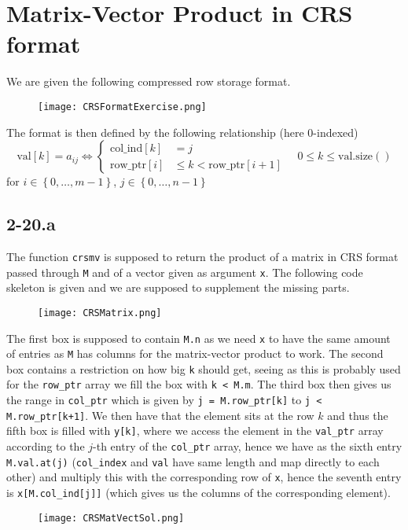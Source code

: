 \documentclass{article}
\begin{document}
\section*{Matrix-Vector Product in CRS format}
We are given the following compressed row storage format.
\begin{figure}[!hbt]
    \centering
\texttt{[image: CRSFormatExercise.png]}
\end{figure}
The format is then defined by the following relationship (here $0$-indexed)
\begin{equation*}
    \text{val}\left[k\right] = a_{ij} \Longleftrightarrow 
    \begin{cases}
        \text{col\_ind}\left[k\right]& = j \\
        \text{row\_ptr}\left[i\right] &\leq k < \text{row\_ptr}\left[i+1\right]
    \end{cases} \quad 0 \leq k \leq \text{val}.\text{size}\left(\right)
\end{equation*}
for $i \in \left\{0, \dots, m-1\right\}$, $j \in \left\{0, \dots, n-1\right\}$
\subsection*{2-20.a}
The function \verb|crsmv| is supposed to return the product of a matrix in CRS format passed through \verb|M| and of a vector given as argument \verb|x|. The following code skeleton is given and we are supposed to supplement the missing parts.

\begin{figure}[!hbt]
    \centering
\texttt{[image: CRSMatrix.png]}
\end{figure}
\noindent The first box is supposed to contain \verb|M.n| as we need \verb|x| to have the same amount of entries as \verb|M| has columns for the matrix-vector product to work. The second box contains a restriction on how big \verb|k| should get, seeing as this is probably used for the  \verb|row_ptr| array we fill the box with \verb|k < M.m|. The third box then gives us the range in \verb|col_ptr| which is given by \verb|j = M.row_ptr[k]| to \verb|j < M.row_ptr[k+1]|. We then have that the element sits at the row $k$ and thus the fifth box is filled with \verb|y[k]|, where we access the element in the \verb|val_ptr| array according to the $j$-th entry of the \verb|col_ptr| array, hence we have as the sixth entry \verb|M.val.at(j)| (\verb|col_index| and \verb|val| have same length and map directly to each other) and multiply this with the corresponding row of \verb|x|, hence the seventh entry is \verb|x[M.col_ind[j]]| (which gives us the columns of the corresponding element). 
\begin{figure}[!hbt]
    \centering
\texttt{[image: CRSMatVectSol.png]}
\end{figure}
\end{document}
